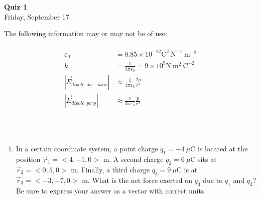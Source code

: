 \documentclass{article}
\begin{document}
\fancyfoot[C]{\thepage}
\vspace*{0cm}
\begin{center}
	{\LARGE \textbf{Quiz 1}}\\
	\vspace{0.25cm}
	\vspace{0.25cm}
	{\Large Friday, September 17}
\end{center}
The following information may or may not be of use:\\
\hrulefill\\
\begin{align*}
	\varepsilon_0 &= 8.85\times10^{-12} \mathrm{C}^2\ \mathrm{N}^{-1}\ \mathrm{m}^{-2}\\
	k&=\frac{1}{4\pi\varepsilon_0}=9\times10^9 \mathrm{N}\ \mathrm{m}^2\ \mathrm{C}^{-2}\\
	|\vec{E}_{dipole, on-axis}| &\approx \frac{1}{4\pi\varepsilon_0}\frac{2p}{r^3}\\
	|\vec{E}_{dipole, perp}| &\approx \frac{1}{4\pi\varepsilon_0}\frac{p}{r^3}
\end{align*}

\hrulefill \\
\\
\begin{enumerate}
	\item In a certain coordinate system, a point charge $q_1=-4\  \mu$C is located at the position $\vec{r}_1=<4,-1,0>$ m. A second charge $q_2=6\ \mu$C sits at $\vec{r}_2=<0,5,0>$ m. Finally, a third charge $q_3=9\ \mu$C is at $\vec{r}_3=<-3,-7,0>$ m. What is the net force exerted on $q_3$ due to $q_1$ and $q_2$? Be sure to express your answer as a vector with correct units.
\end{enumerate}
\end{document}
